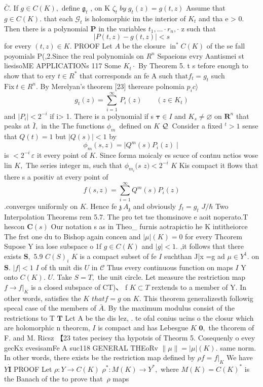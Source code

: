 ${\bar{C}}.$ If $g\in C(K),$ define ${\mathfrak{g}}_{t}$ , on K $\zeta_{t}\;b y\;g_{t}(z)=g(t,z)$ Assume that $g\in C(K).$ that each ${\mathcal{G}}_{t}$ is holomorphic im the interior of $K_{t}$ and tha e > 0. Then there is a polynomial ${\boldsymbol{P}}$ in the variables $t_{1},\ldots\cdot r_{n},\cdot$ z such that $$ \left|P(t,z)-g(t,z)\right|<s $$ for every $(t,z)\in K.$ PROOF Let $\textstyle A$ be the closure $\operatorname{in}^{*}C(K)$ of the se fall poyomials P(,2.Since the real polynomials on $R^{n}$ Sspaeions evry Aantismei st liesisoME APPLICATIONs 117 Some $\scriptstyle{K_{t}\cdot}$ By Theorem 5. t s tefore enough to show that to ery $\scriptstyle t\in R^{*}$ that corresponds an fe A such $\mathrm{that}f_{t}=g_{t}$ such ${\mathrm{Fix}}\ t\in R^{n}.$ By Merelyan's theorem [23] thereare polnomia $\scriptstyle{p_{i}c\rangle}$ $$ g_{t}(z)=\sum_{i=1}^{\infty}\,P_{i}(z)\qquad(z\in K_{t}) $$ and $|P_{i}|<2^{-i}$ if i> 1. There is a polynomial if s ${\boldsymbol{\tau}}\in I$ and $K_{s}\neq\varnothing$ on ${\boldsymbol{R}}^{n}$ that peaks at ${\bar{I}},$ in the The functions $\phi_{m}\,$ defined on $\textstyle K$ ${\cal Q}\,$ Consider a fixed ${}^{t}>1$ sense that $Q(t)=1$ but $|Q(s)|<1$ by $$ \phi_{m}(s,z)=\mid Q^{m}(s)P_{i}(z)\mid $$ is $<2^{-i}\,\varepsilon$ it every point of $K.$ Since forma moicaly es scuce of contnu nctios wose lin $K,$ The series integer m, such that $\phi_{m_{i}}(s$ $z)<2^{-i}$ $\textstyle K$ Kis compact it flows that there s a positiv at every point of $$ f(s,z)=\sum_{i=1}^{\infty}Q^{m}(s)P_{i}(z) $$ .converges uniformly on $K.$ Hence fe ${\mathfrak{z}}\,A_{\mathfrak{z}}$ and obviously $f_{t}=g_{t}$ $J/\hbar$ Two Interpolation Theorems rem 5.7. The pro tet tse thomsinove e aoit noperato.T hescon ${\boldsymbol{C}}(s)$ Our notation s as in Theo_ furnis aotrapictio he K intitheiorce The frst one du to Bishop again concen and $|\mu|(K)=0$ for every Thcorem Supose Y isa lose subspace o 1f $g\in C(K)$ and $|g|<1.$ ,it follows that there exists ${\boldsymbol{S}},$ 5.9 $C(S)_{i}$ $K$ is a compact subset of fe $\boldsymbol{\mathit{I}}$ suchthan J|x =g ad $\mu\in Y^{1}.$ on $\mathbf{S}.$ $|f|<1$ $\boldsymbol{\mathit{I}}$ of th unit dis $U$ in $\textstyle{\mathcal{C}}$ Thus every continuous function on maps $\boldsymbol{\mathit{I}}$ Y onto $C(K).$ $U.$ Take $S=T,$ the unit circle. Let measure the restriction map $f\to f|_{K}$ is a closed subspace of CT)、 f $K\subset T$ rextends to a member of Y. In other words, satisfies the $\textstyle K$ $t h a t f=g$ on $K.$ This theorem generalizesth followig specal case of the members of ${\bar{A}}.$ By the maximum modulus consist of the restrictions to T ${\boldsymbol{T}}$ Lct A be the dis lez, . te ofal conius ucins o the closur which are holomorphic n theorcm, $\boldsymbol{\mathit{I}}$ is compact and has Lebesgue $\textstyle K$ $\mathbf{0},$ the thcorem of F. and M. Ricsz 【23 tates pecisey tha hypotsis of Theorm 5. Cosequenly o evey gecKx evesisamFe A suc118 GENERAL THEoRv $\|\mu\|=|\mu|(K).$ same norm. In other words, there exists be the restriction map defined by $\rho f=f{\big|}_{K}$ We have $Y{\dot{\boldsymbol{I}}}$ PROOF Let $\rho\colon Y\to C(K)$ $\rho^{*}\colon M(K)\to Y^{*},$ where $M(K)=C(K)^{\ast}$ is the Banach of the to prove that $~\rho$ maps 